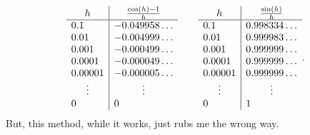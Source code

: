 \documentclass{article}
\begin{document}
$$
  \begin{array}{l|l}
    \multicolumn{1}{c|}{h}            & \multicolumn{1}{c}{\frac{\cos(h) - 1}{h}} \\ \hline 
    0.1                               & -0.049958\dots                                 \\
    0.01                              & -0.004999\dots                                 \\
    0.001                             & -0.000499\dots                                 \\
    0.0001                            & -0.000049\dots                                 \\
    0.00001                           & -0.000005\dots                                 \\
    \multicolumn{1}{c|}{\vdots}       & \multicolumn{1}{c}{\vdots}                \\
    0                                 & 0                                         \\
  \end{array}
  \qquad
  \begin{array}{l|l}
    \multicolumn{1}{c|}{h}            & \multicolumn{1}{c}{\frac{\sin(h)}{h}}     \\ \hline 
    0.1                               & 0.998334\dots                                  \\
    0.01                              & 0.999983\dots                                  \\
    0.001                             & 0.999999\dots                                  \\
    0.0001                            & 0.999999\dots                                  \\
    0.00001                           & 0.999999\dots                                  \\
    \multicolumn{1}{c|}{\vdots}       & \multicolumn{1}{c}{\vdots}                \\
    0                                 & 1                                         \\
  \end{array} .
$$
But, this method, while it works, just rubs me the wrong way. \\
 
\end{document}

